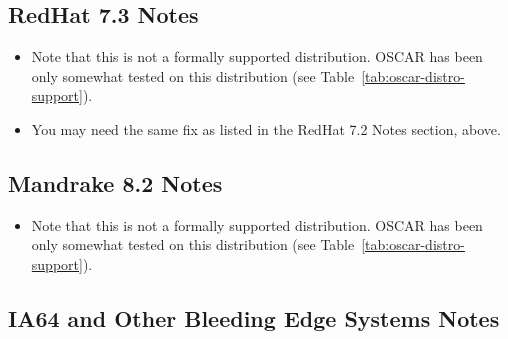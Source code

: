 
\subsection{RedHat 7.3 Notes}
\label{subsec:rh73notes}

\begin{itemize}
\item Note that this is not a formally supported distribution.  OSCAR
  \oscarversion\- has been only somewhat tested on this distribution
  (see Table~\ref{tab:oscar-distro-support}).

\item You may need the same  fix as listed
  in the RedHat 7.2 Notes section, above.
\end{itemize}


\subsection{Mandrake 8.2 Notes}
\label{subsec:mdk82notes}

\begin{itemize}
\item Note that this is not a formally supported distribution.  OSCAR
  \oscarversion\- has been only somewhat tested on this distribution
  (see Table~\ref{tab:oscar-distro-support}).
\end{itemize}


\subsection{IA64 and Other Bleeding Edge Systems Notes}
\label{subsec:ia64notes}

